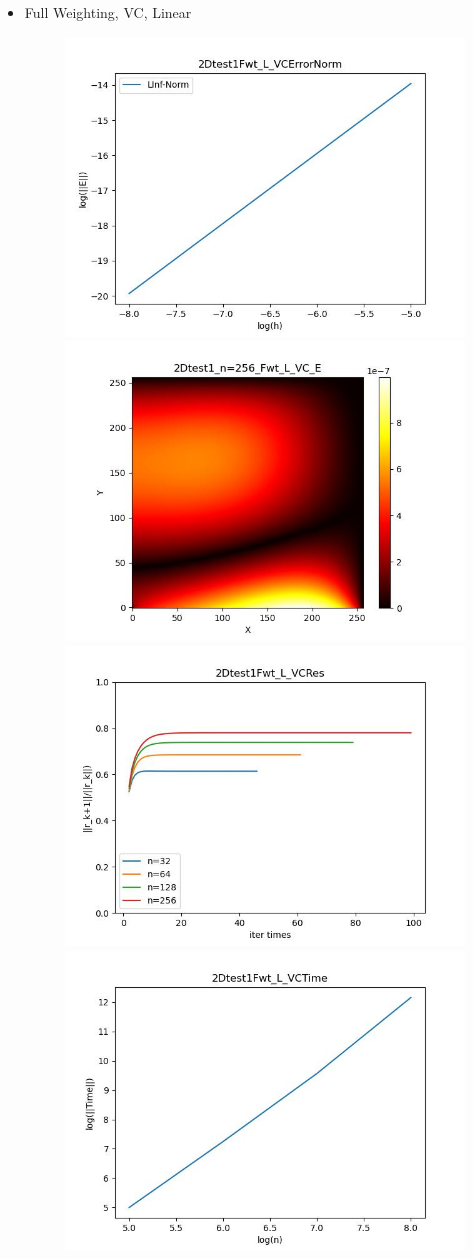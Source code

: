 \documentclass{article}
\begin{document}
\begin{itemize}
    \item Full Weighting, VC, Linear
    \begin{figure}[h]
        \centering
        \includegraphics[width=0.35\linewidth]{2Dtest1Fwt_L_VCErrorNorm.jpg}
        \includegraphics[width=0.35\linewidth]{2Dtest1_n=256_Fwt_L_VC_E.jpg}
        \includegraphics[width=0.35\linewidth]{2Dtest1Fwt_L_VCRes.jpg}
        \includegraphics[width=0.35\linewidth]{2Dtest1Fwt_L_VCTime.jpg}
    \end{figure}
    

\end{itemize}
\end{document}
